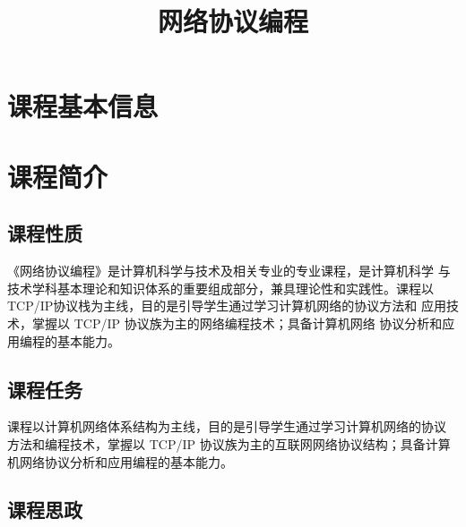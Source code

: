 \documentclass{swfusyllabus}
\title{网络协议编程}
\begin{document}
\maketitle{}

\section{课程基本信息}

\basicinfo{}

\section{课程简介}

\subsection{课程性质}

《网络协议编程》是计算机科学与技术及相关专业的专业课程，是计算机科学
与技术学科基本理论和知识体系的重要组成部分，兼具理论性和实践性。课程以
TCP/IP协议栈为主线，目的是引导学生通过学习计算机网络的协议方法和
应用技术，掌握以 TCP/IP 协议族为主的网络编程技术；具备计算机网络
协议分析和应用编程的基本能力。

\subsection{课程任务}




课程以计算机网络体系结构为主线，目的是引导学生通过学习计算机网络的协议
方法和编程技术，掌握以 TCP/IP 协议族为主的互联网网络协议结构；具备计算
机网络协议分析和应用编程的基本能力。

\subsection{课程思政}
\end{document}
